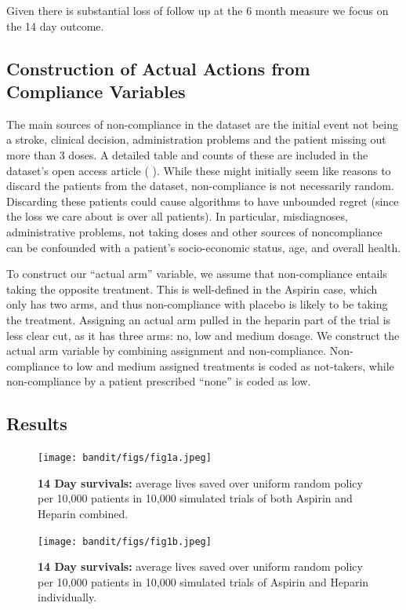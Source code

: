 Given there is substantial loss of follow up at the 6 month measure we focus on the 14 day outcome.


\subsection{Construction of Actual Actions from Compliance Variables}
The main sources of non-compliance in the dataset are the initial event not being a stroke, clinical decision, administration problems and the patient missing out more than 3 doses. A detailed table and counts of these are included in the dataset's open access article ( \cite{ist:11}). 
While these might initially seem like reasons to discard the patients from the dataset, non-compliance is not necessarily random. Discarding these patients could cause algorithms to have unbounded regret (since the loss we care about is over all patients). In particular, misdiagnoses, administrative problems, not taking doses and other sources of noncompliance can be confounded with a patient's socio-economic status, age, and overall health. 

To construct our ``actual arm'' variable, we assume that non-compliance entails taking the opposite treatment.
This is well-defined in the Aspirin case, which only has two arms, and thus non-compliance with placebo is likely to be taking the treatment.
Assigning an actual arm pulled in the heparin part of the trial is less clear cut, as it has three arms: no, low and medium dosage. We construct the actual arm variable by combining assignment and non-compliance. Non-compliance to low and medium assigned treatments is coded as not-takers, while non-compliance by a patient prescribed ``none'' is coded as low.


\subsection{Results}

\begin{figure}
\begin{center}
\texttt{[image: bandit/figs/fig1a.jpeg]}
\caption{\textbf{14 Day survivals:} average lives saved over uniform random policy per 10,000 patients in 10,000 simulated trials of both Aspirin and Heparin combined.}
\label{fig1a}
\end{center}
\end{figure} 

\begin{figure}
\begin{center}
\texttt{[image: bandit/figs/fig1b.jpeg]}
\caption{\textbf{14 Day survivals:} average lives saved over uniform random policy per 10,000 patients in 10,000 simulated trials of Aspirin and Heparin individually.}
\label{fig1b}
\end{center}
\end{figure} 


